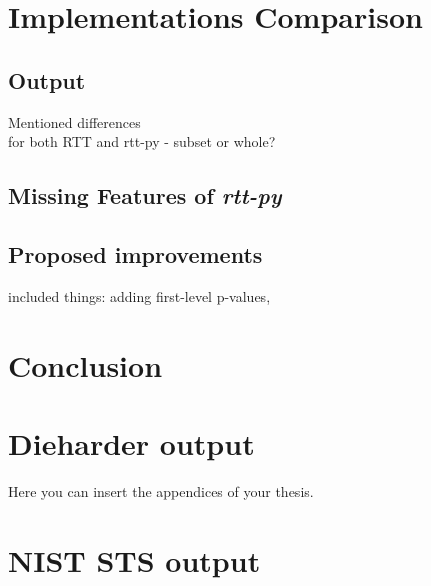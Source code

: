 \documentclass[
  digital,     %
  oneside,     %
  nosansbold,  %
  nocolorbold, %
  nolof,         %
  nolot,         %
]{fithesis4}
\begin{document}
\chapter{Implementations Comparison}

\section{Output}
Mentioned differences\\
for both RTT and rtt-py - subset or whole?

\section{Missing Features of \emph{rtt-py}}

\section{Proposed improvements}
included things: adding first-level p-values, 


\chapter{Conclusion}

\appendix 

\chapter{Dieharder output} \label{append:dieharder-output}
Here you can insert the appendices of your thesis.

\chapter{NIST STS output} \label{append:nist-output}
\end{document}
